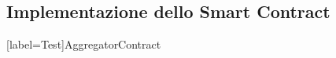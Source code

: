 \begin{appendices}

    \section{Implementazione dello Smart Contract}
    [label=Test]{AggregatorContract \label{cod:aggregatorContract}}
    \inputminted[linenos]{solidity}{../contracts/contracts/AggregatorContract.sol}

\end{appendices}